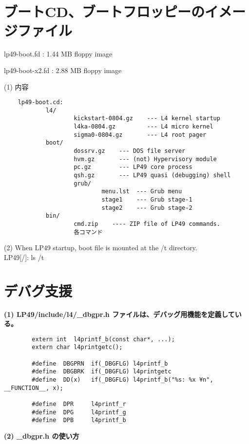 \section{ブートCD、ブートフロッピーのイメージファイル}

      lp49-boot.fd : 1.44 MB floppy image

      lp49-boot-x2.fd :  2.88 MB floppy image
    
    (1) 内容

\begin{verbatim}
    lp49-boot.cd:
            l4/
                    kickstart-0804.gz    --- L4 kernel startup  
                    l4ka-0804.gz         --- L4 micro kernel
                    sigma0-0804.gz       --- L4 root pager
            boot/      
                    dossrv.gz    --- DOS file server
                    hvm.gz       --- (not) Hypervisory module
                    pc.gz        --- LP49 core process
                    qsh.gz       --- LP49 quasi (debugging) shell
                    grub/
                            menu.lst  --- Grub menu
                            stage1    --- Grub stage-1
                            stage2    --- Grub stage-2
            bin/       
                    cmd.zip    ---- ZIP file of LP49 commands.
                    各コマンド
\end{verbatim}    
    
    (2) When LP49 startup, boot file is mounted at the /t directory. \\
         LP49[/]: ls /t


\section{デバグ支援}


{\bf  (1)  LP49/include/l4/\_dbgpr.h ファイルは、デバッグ用機能を定義している。}

\begin{verbatim}
        extern int  l4printf_b(const char*, ...);
        extern char l4printgetc();
         
        #define  DBGPRN  if(_DBGFLG) l4printf_b
        #define  DBGBRK  if(_DBGFLG) l4printgetc
        #define  DD(x)   if(_DBGFLG) l4printf_b("%s: %x ¥n", __FUNCTION__, x);
         
        #define  DPR     l4printf_r
        #define  DPG     l4printf_g
        #define  DPB     l4printf_b
\end{verbatim}
   
{\bf (2) \_dbgpr.h の使い方}\\


